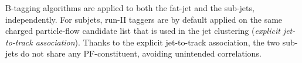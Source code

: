 % 
B-tagging algorithms are applied to both the fat-jet and the sub-jets, independently. For subjets, run-II taggers are by default applied on the same charged particle-flow candidate list that is used in the jet clustering (\emph{explicit jet-to-track association}). Thanks to the explicit jet-to-track association, the two sub-jets do not share any PF-constituent, avoiding unintended correlations.
% 
% 

